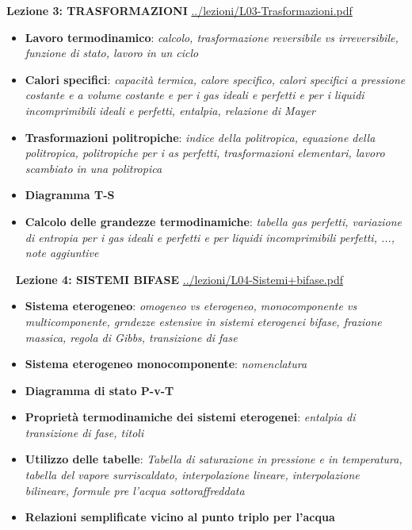 \documentclass[a4paper, 9pt]{article}
\begin{document}
    \textbf{Lezione 3: TRASFORMAZIONI}\newline
    \url{../lezioni/L03-Trasformazioni.pdf}
    \begin{itemize}
        \item \textbf{Lavoro termodinamico}: \textit{calcolo, trasformazione reversibile vs irreversibile, funzione di stato, lavoro in un ciclo}
        \item \textbf{Calori specifici}: \textit{capacità termica, calore specifico, calori specifici a pressione costante e a volume costante e per i gas ideali e perfetti e per i liquidi incomprimibili ideali e perfetti, entalpia, relazione di Mayer}
        \item \textbf{Trasformazioni politropiche}: \textit{indice della politropica, equazione della politropica, politropiche per i as perfetti, trasformazioni elementari, lavoro scambiato in una politropica}
        \item \textbf{Diagramma T-S}
        \item \textbf{Calcolo delle grandezze termodinamiche}: \textit{tabella gas perfetti, variazione di entropia per i gas ideali e perfetti e per liquidi incomprimibili perfetti, ..., note aggiuntive}
    \end{itemize}
    \ \newline
    \newline
    \textbf{Lezione 4: SISTEMI BIFASE}\newline
    \url{../lezioni/L04-Sistemi+bifase.pdf}
    \begin{itemize}
        \item \textbf{Sistema eterogeneo}: \textit{omogeneo vs eterogeneo, monocomponente vs multicomponente, grndezze estensive in sistemi eterogenei bifase, frazione massica, regola di Gibbs, transizione di fase}
        \item \textbf{Sistema eterogeneo monocomponente}: \textit{nomenclatura}
        \item \textbf{Diagramma di stato P-v-T}
        \item \textbf{Proprietà termodinamiche dei sistemi eterogenei}: \textit{entalpia di transizione di fase, titoli}
        \item \textbf{Utilizzo delle tabelle}: \textit{Tabella di saturazione in pressione e in temperatura, tabella del vapore surriscaldato, interpolazione lineare, interpolazione bilineare, formule pre l'acqua sottoraffreddata}
        \item \textbf{Relazioni semplificate vicino al punto triplo per l'acqua}
    \end{itemize}
\end{document}
